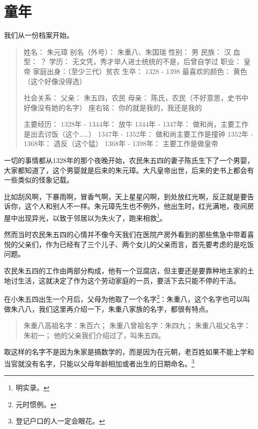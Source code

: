 \section{童年}
\ifnum{}
	\begin{multicols}{\theparacolNo}
		\fi
		我们从一份档案开始。
		{\footnotesize \begin{quote}
			姓名： 朱元璋
			别名（外号）： 朱重八、朱国瑞
			性别： 男
			民族： 汉
			血型： ？
			学历： 无文凭，秀才举人进士统统的不是，后曾自学过
			职业： 皇帝
			家庭出身：（至少三代）贫农
			生卒： 1328 - 1398
			最喜欢的颜色： 黄色（这个好像没得选）

			社会关系：
			父亲： 朱五四，农民
			母亲： 陈氏，农民（不好意思，史书中好像没有她的名字）
			座右铭： 你的就是我的，我还是我的

			主要经历：
			1328年 - 1344年： 放牛
			1344年 - 1347年： 做和尚，主要工作是出去讨饭（这个……）
			1347年 - 1352年： 做和尚主要工作是撞钟
			1352年 - 1368年： 造反（这个猛）
			1368年 - 1398年： 主要工作是做皇帝
		\end{quote}}

		一切的事情都从1328年的那个夜晚开始，农民朱五四的妻子陈氏生下了一个男婴，大家都知道了，这个男婴就是后来的朱元璋。大凡皇帝出世，后来的史书上都会有一些类似的怪象记载。

		比如刮风啊，下暴雨啊，冒香气啊，天上星星闪啊，到处放红光啊，反正就是要告诉你，这个人和别人不一样。朱元璋先生也不例外，他出生时，红光满地，夜间房屋中出现异光，以致于邻居以为失火了，跑来相救\footnote{明实录。}。

		然而当时农民朱五四的心情并不像今天我们在医院产房外看到的那些焦急中带着喜悦的父亲们，作为已经有了三个儿子、两个女儿的父亲而言，首先要考虑的是吃饭问题。

		农民朱五四的工作由两部分构成，他有一个豆腐店，但主要还是要靠种地主家的土地讨生活，这就决定了作为这个劳动家庭的一员，要活下去只能不停的干活。

		在小朱五四出生一个月后，父母为他取了一个名字\footnote{元时惯例。}：朱重八，这个名字也可以叫做朱八八，我们这里再介绍一下，朱重八家族的名字，都很有特点。
		{\footnotesize \begin{quote}
			朱重八高祖名字：朱百六；
			朱重八曾祖名字：朱四九；
			朱重八祖父名字：朱初一；
			他的父亲我们介绍过了，叫朱五四。
		\end{quote}}

		取这样的名字不是因为朱家是搞数学的，而是因为在元朝，老百姓如果不能上学和当官就没有名字，只能以父母年龄相加或者出生的日期命名。\footnote{登记户口的人一定会眼花。}


\end{multicols}
